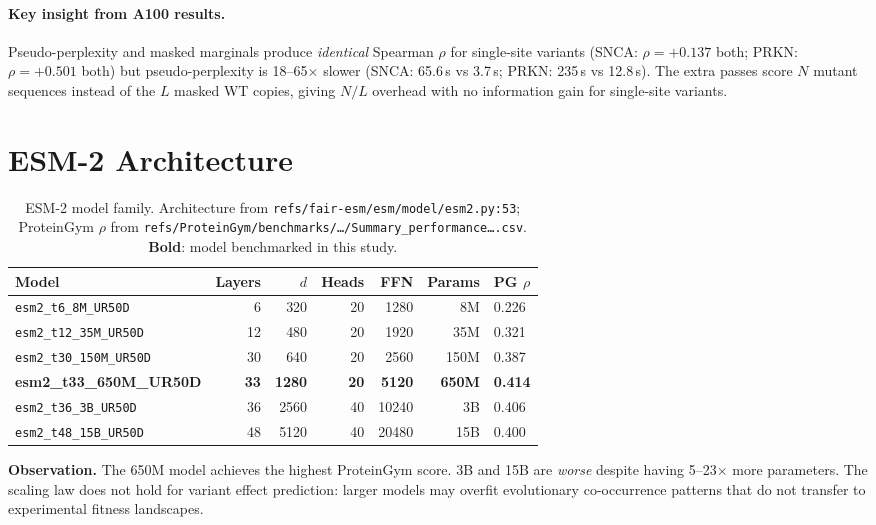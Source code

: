 \documentclass[11pt,a4paper]{article}
\begin{document}
\paragraph{Key insight from A100 results.}
Pseudo-perplexity and masked marginals produce \emph{identical} Spearman $\rho$
for single-site variants (SNCA: $\rho=+0.137$ both; PRKN: $\rho=+0.501$ both)
but pseudo-perplexity is 18--65$\times$ slower
(SNCA: 65.6\,s vs 3.7\,s; PRKN: 235\,s vs 12.8\,s).
The extra passes score $N$ mutant sequences instead of the $L$
masked WT copies, giving $N/L$ overhead with no information gain for
single-site variants.

\section{ESM-2 Architecture}

\begin{table}[ht]
\centering
\caption{ESM-2 model family. Architecture from
\texttt{refs/fair-esm/esm/model/esm2.py:53}; ProteinGym $\rho$ from
\texttt{refs/ProteinGym/benchmarks/\ldots/Summary\_performance\ldots.csv}.
\textbf{Bold}: model benchmarked in this study.}
\label{tab:models}
\begin{tabular}{lrrrrrl}
\toprule
Model & Layers & $d$ & Heads & FFN & Params & PG $\rho$ \\
\midrule
\texttt{esm2\_t6\_8M\_UR50D}    &  6 &  320 & 20 &  1280 &   8M & 0.226 \\
\texttt{esm2\_t12\_35M\_UR50D}  & 12 &  480 & 20 &  1920 &  35M & 0.321 \\
\texttt{esm2\_t30\_150M\_UR50D} & 30 &  640 & 20 &  2560 & 150M & 0.387 \\
\textbf{esm2\_t33\_650M\_UR50D} & \textbf{33} & \textbf{1280} & \textbf{20} & \textbf{5120} & \textbf{650M} & \textbf{0.414} \\
\texttt{esm2\_t36\_3B\_UR50D}   & 36 & 2560 & 40 & 10240 &   3B & 0.406 \\
\texttt{esm2\_t48\_15B\_UR50D}  & 48 & 5120 & 40 & 20480 &  15B & 0.400 \\
\bottomrule
\end{tabular}
\end{table}

\begin{infobox}
\textbf{Observation.} The 650M model achieves the highest ProteinGym score.
3B and 15B are \emph{worse} despite having 5--23$\times$ more parameters.
The scaling law does not hold for variant effect prediction: larger models may
overfit evolutionary co-occurrence patterns that do not transfer to
experimental fitness landscapes.
\end{infobox}
\end{document}
